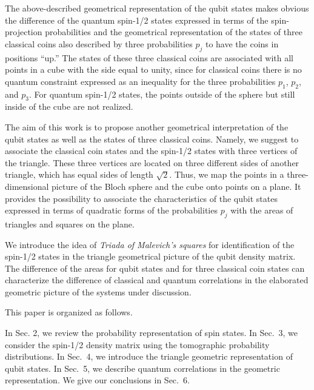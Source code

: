 \documentclass[12pt]{article}
\begin{document}
The above-described geometrical representation of the qubit states
makes obvious the difference of the quantum spin-1/2 states
expressed in terms of the spin-projection probabilities and the
geometrical representation of the states of three classical coins
also described by three probabilities $p_j$ to have the coins in
positions ``up.'' The states of these three classical coins are
associated with all points in a cube with the side equal to unity,
since for classical coins there is no quantum constraint expressed
as an inequality for the three probabilities $p_1$, $p_2$, and
$p_3$. For quantum spin-1/2 states, the points outside of the sphere
but still inside of the cube are not realized.

The aim of this work is to propose another geometrical
interpretation of the qubit states as well as the states of three
classical coins. Namely, we suggest to associate the classical coin
states and the spin-1/2 states with three vertices of the triangle.
These three vertices are located on three different sides of another
triangle, which has equal sides of length $\sqrt 2$. Thus, we map
the points in a three-dimensional picture of the Bloch sphere and
the cube onto points on a plane. It provides the possibility to
associate the characteristics of the qubit states expressed in terms
of quadratic forms of the probabilities $p_j$ with the areas of
triangles and squares on the plane.

We introduce the idea of {\it Triada of Malevich's squares} for
identification of the spin-1/2 states in the triangle geometrical
picture of the qubit density matrix. The difference of the areas for
qubit states and for three classical coin states can characterize
the difference of classical and quantum correlations in the
elaborated geometric picture of the systems under discussion.

This paper is organized as follows.

In Sec. 2, we review the probability representation of spin states.
In Sec.~3, we consider the spin-1/2 density matrix using the
tomographic probability distributions. In Sec.~4, we introduce the
triangle geometric representation of qubit states. In Sec.~5, we
describe quantum correlations in the geometric representation. We
give our conclusions in Sec.~6.
\end{document}
